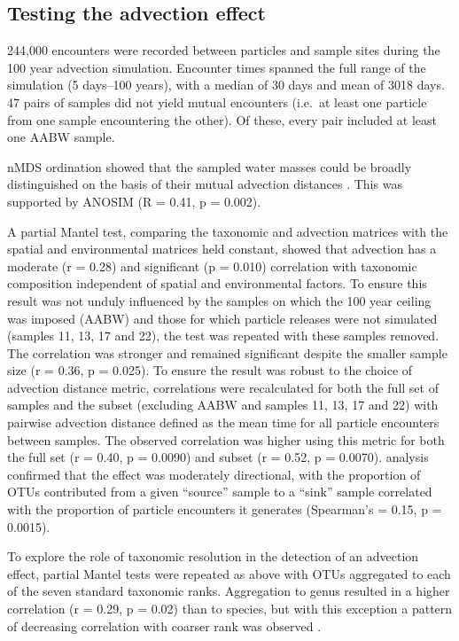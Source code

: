 \subsection{Testing the advection effect}

244,000 encounters were recorded between particles and sample sites during the 100 year advection simulation.
Encounter times spanned the full range of the simulation (5 days--100 years), with a median of 30 days and mean of 3018 days.
47 pairs of samples did not yield mutual encounters (i.e.\ at least one particle from one sample encountering the other).
Of these, every pair included at least one AABW sample.

\ac{nMDS} ordination showed that the sampled water masses could be broadly distinguished on the basis of their mutual advection distances .
This was supported by \ac{ANOSIM} (R = 0.41, p = 0.002).



A partial Mantel test, comparing the taxonomic and advection matrices with the spatial and environmental matrices held constant, showed that advection has a moderate (r = 0.28) and significant (p = 0.010) correlation with taxonomic composition independent of spatial and environmental factors.
To ensure this result was not unduly influenced by the samples on which the 100 year ceiling was imposed (\ac{AABW}) and those for which particle releases were not simulated (samples 11, 13, 17 and 22), the test was repeated with these samples removed.
The correlation was stronger and remained significant despite the smaller sample size (r = 0.36, p = 0.025).
To ensure the result was robust to the choice of advection distance metric, correlations were recalculated for both the full set of samples and the subset (excluding \ac{AABW} and samples 11, 13, 17 and 22) with pairwise advection distance defined as the mean time for all particle encounters between samples.
The observed correlation was higher using this metric for both the full set (r = 0.40, p = 0.0090) and subset (r = 0.52, p = 0.0070).
 analysis confirmed that the effect was moderately directional, with the proportion of \acp{OTU} contributed from a given ``source'' sample to a ``sink'' sample correlated with the proportion of particle encounters it generates (Spearman's \textrho{} = 0.15, p = 0.0015). 

To explore the role of taxonomic resolution in the detection of an advection effect, partial Mantel tests were repeated as above with \acp{OTU} aggregated to each of the seven standard taxonomic ranks.
Aggregation to genus resulted in a higher correlation (r = 0.29, p = 0.02) than to species, but with this exception a pattern of decreasing correlation with coarser rank was observed .

